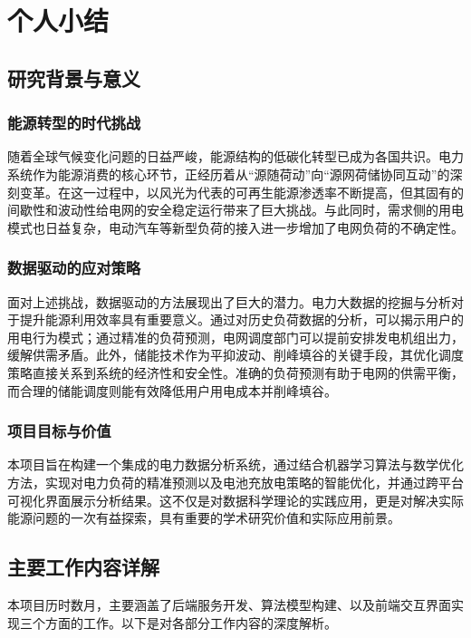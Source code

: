 \chapter{个人小结}

\section{研究背景与意义}

\subsection{能源转型的时代挑战}
随着全球气候变化问题的日益严峻，能源结构的低碳化转型已成为各国共识。电力系统作为能源消费的核心环节，正经历着从“源随荷动”向“源网荷储协同互动”的深刻变革。在这一过程中，以风光为代表的可再生能源渗透率不断提高，但其固有的间歇性和波动性给电网的安全稳定运行带来了巨大挑战。与此同时，需求侧的用电模式也日益复杂，电动汽车等新型负荷的接入进一步增加了电网负荷的不确定性。

\subsection{数据驱动的应对策略}
面对上述挑战，数据驱动的方法展现出了巨大的潜力。电力大数据的挖掘与分析对于提升能源利用效率具有重要意义。通过对历史负荷数据的分析，可以揭示用户的用电行为模式；通过精准的负荷预测，电网调度部门可以提前安排发电机组出力，缓解供需矛盾。此外，储能技术作为平抑波动、削峰填谷的关键手段，其优化调度策略直接关系到系统的经济性和安全性。准确的负荷预测有助于电网的供需平衡，而合理的储能调度则能有效降低用户用电成本并削峰填谷\cite{lund2017batteries}。

\subsection{项目目标与价值}
本项目旨在构建一个集成的电力数据分析系统，通过结合机器学习算法与数学优化方法，实现对电力负荷的精准预测以及电池充放电策略的智能优化，并通过跨平台可视化界面展示分析结果。这不仅是对数据科学理论的实践应用，更是对解决实际能源问题的一次有益探索，具有重要的学术研究价值和实际应用前景。

\section{主要工作内容详解}

本项目历时数月，主要涵盖了后端服务开发、算法模型构建、以及前端交互界面实现三个方面的工作。以下是对各部分工作内容的深度解析。

